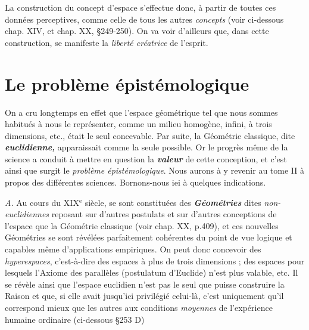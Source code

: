 La construction du concept d’espace s’effectue donc, à partir de
toutes ces données perceptives, comme celle de tous les autres {\it concepts}
(voir ci-dessous chap. XIV, et chap. XX, \S 249-250). On va voir
d’ailleurs que, dans cette construction, se manifeste la {\it liberté créatrice}
de l'esprit.

\section{Le problème épistémologique}%
On a cru longtemps en
effet que l’espace géométrique tel que nous sommes habitués à nous
le représenter, comme un milieu homogène, infini, à trois dimensions,
etc., était le seul concevable. Par suite, la Géométrie classique,
dite \textbf{\textit {euclidienne,}} apparaissait comme la seule possible. Or le progrès
même de la science a conduit à mettre en question la \textbf{\textit {valeur}} de cette
conception, et c’est ainsi que surgit le {\it problème épistémologique}. Nous
aurons à y revenir au tome II à propos des différentes sciences.
Bornons-nous iei à quelques indications.

{\it A.} Au cours du {\footnotesize XIX}$^\text{e}$ siècle, se sont constituées des \textbf{\textit {Géométries}}
dites {\it non-euclidiennes} reposant sur d’autres postulats et sur d’autres
conceptions de l’espace que la Géométrie classique (voir chap. XX,
p.409), et ces nouvelles Géométries se sont révélées parfaitement
cohérentes du point de vue logique et capables même d'applications
empiriques. On peut donc concevoir des {\it hyperespaces}, c'est-à-dire des
espaces à plus de trois dimensions ; des espaces pour lesquels l'Axiome
des parallèles (postulatum d’Euclide) n’est plus valable, etc. Il se
révèle ainsi que l’espace euclidien n’est pas le seul que puisse construire
la Raison et que, si elle avait jusqu'ici privilégié celui-là, c'est
uniquement qu’il correspond mieux que les autres aux conditions
{\it moyennes} de l'expérience humaine ordinaire (ci-dessous \S 253 D)


